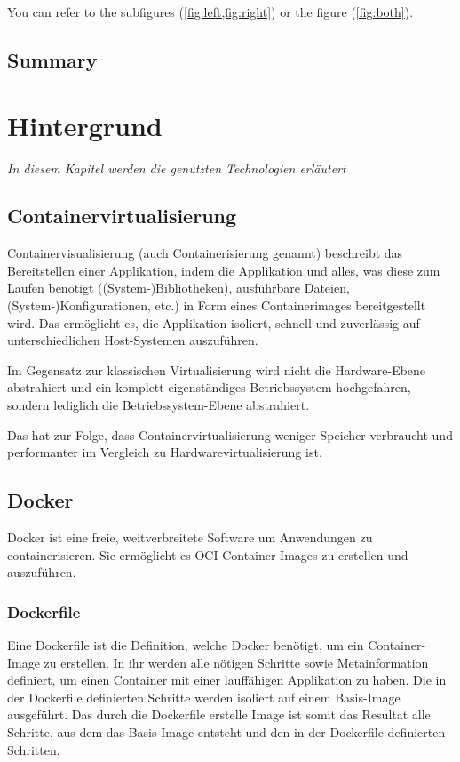 \documentclass[
  12pt,
  a4paper,
  printlength,
  bibliography=totoc,
  chapterprefix,
  headings=openright,
  numbers=endperiod,
  parskip=half,
  twoside
]{scrreprt}
\begin{document}
You can refer to the subfigures (\cref{fig:left,fig:right}) or the figure (\cref{fig:both}).

\section*{Summary}

\lipsum[2]

\chapter{Hintergrund}
\label{cha:background}

\textit{In diesem Kapitel werden die genutzten Technologien erläutert}

\section{Containervirtualisierung}

Containervisualisierung (auch Containerisierung genannt) beschreibt das Bereitstellen einer Applikation, indem die Applikation und alles, was diese zum Laufen benötigt ((System-)Bibliotheken), ausführbare Dateien, (System-)Konfigurationen, etc.) in Form eines Containerimages bereitgestellt wird. Das ermöglicht es, die Applikation isoliert, schnell und zuverlässig auf unterschiedlichen Host-Systemen auszuführen.

Im Gegensatz zur klassischen Virtualisierung wird nicht die Hardware-Ebene abstrahiert und ein komplett eigenständiges Betriebssystem hochgefahren, sondern lediglich die Betriebssystem-Ebene abstrahiert.

Das hat zur Folge, dass Containervirtualisierung weniger Speicher verbraucht und performanter im Vergleich zu Hardwarevirtualisierung ist.

\section{Docker}

Docker ist eine freie, weitverbreitete Software um Anwendungen zu containerisieren. Sie ermöglicht es OCI-Container-Images zu erstellen und auszuführen.

\subsection{Dockerfile}

Eine Dockerfile ist die Definition, welche Docker benötigt, um ein Container-Image zu erstellen. In ihr werden alle nötigen Schritte sowie Metainformation definiert, um einen Container mit einer lauffähigen Applikation zu haben. Die in der Dockerfile definierten Schritte werden isoliert auf einem Basis-Image ausgeführt. Das durch die Dockerfile erstelle Image ist somit das Resultat alle Schritte, aus dem das Basis-Image entsteht und den in der Dockerfile definierten Schritten.
\end{document}
